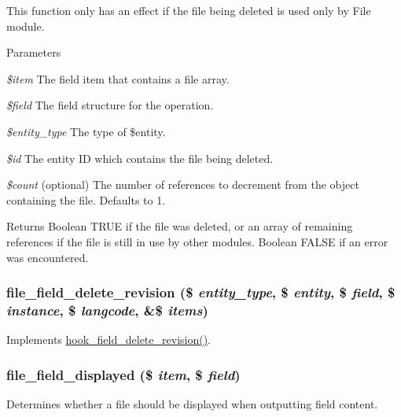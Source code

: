 This function only has an effect if the file being deleted is used only by File module.


\begin{DoxyParams}{Parameters}
\item[{\em \$item}]The field item that contains a file array. \item[{\em \$field}]The field structure for the operation. \item[{\em \$entity\_\-type}]The type of \$entity. \item[{\em \$id}]The entity ID which contains the file being deleted. \item[{\em \$count}](optional) The number of references to decrement from the object containing the file. Defaults to 1.\end{DoxyParams}
\begin{DoxyReturn}{Returns}
Boolean TRUE if the file was deleted, or an array of remaining references if the file is still in use by other modules. Boolean FALSE if an error was encountered. 
\end{DoxyReturn}
\hypertarget{file_8field_8inc_ae78329c465bca7d8cdad9d317db666d4}{
\subsubsection[{file\_\-field\_\-delete\_\-revision}]{\setlength{\rightskip}{0pt plus 5cm}file\_\-field\_\-delete\_\-revision (\$ {\em entity\_\-type}, \/  \$ {\em entity}, \/  \$ {\em field}, \/  \$ {\em instance}, \/  \$ {\em langcode}, \/  \&\$ {\em items})}}
\label{file_8field_8inc_ae78329c465bca7d8cdad9d317db666d4}
Implements \hyperlink{group__field__types_gaef667d4ba12f6fb9950876e6f4f63878}{hook\_\-field\_\-delete\_\-revision()}. \hypertarget{file_8field_8inc_a306d17ad8da55fcbc508aa273abc94d1}{
\subsubsection[{file\_\-field\_\-displayed}]{\setlength{\rightskip}{0pt plus 5cm}file\_\-field\_\-displayed (\$ {\em item}, \/  \$ {\em field})}}
\label{file_8field_8inc_a306d17ad8da55fcbc508aa273abc94d1}
Determines whether a file should be displayed when outputting field content.


